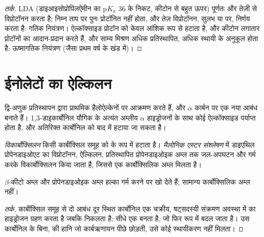 \begin{proof}[तर्क]
LDA (डाइआइसोप्रोपिलऐमीन का $\mathrm pK_a$ 36 के निकट, कीटोन से बहुत ऊपर) पूर्णतः और
तेज़ी से विप्रोटॉनन करता है; निम्न ताप पर  पुनः प्रोटॉनित नहीं होता, और तेज़ विप्रोटॉनन, सुलभ
 या  पर, निर्णय करता है: गतिक नियंत्रण। ऐल्कॉक्साइड प्रोटॉन को केवल आंशिक रूप से हटाता है,
 और कीटोन लगातार प्रोटॉनों का आदान-प्रदान करते हैं, और साम्य मिश्रण अधिक
प्रतिस्थापित, अधिक स्थायी  के अनुकूल होता है: ऊष्मागतिक नियंत्रण (जैसा प्रथम वर्ष के खंड में)।
\end{proof}

\section{ईनोलेटों का ऐल्किलन}

 द्वि-अणुक प्रतिस्थापन द्वारा प्राथमिक हैलोऐल्केनों पर आक्रमण करते हैं, और $\alpha$ कार्बन पर एक नया  आबंध
बनाते हैं। 1,3-डाइकार्बोनिल यौगिक के अत्यंत अम्लीय $\alpha$ हाइड्रोजनों के साथ कोई ऐल्कॉक्साइड
पर्याप्त होता है, और अतिरिक्त कार्बोनिल को बाद में हटाया जा सकता है।

\begin{definition}[विकार्बोक्सिलन]\label{def:b2:enolates-aldol:decarboxylation}
\emph{विकार्बोक्सिलन} किसी कार्बॉक्सिल समूह को  के रूप में हटाता है।
\emph{मैलोनिक एस्टर संश्लेषण} में डाइएथिल प्रोपेनडाइओएट का विप्रोटॉनन,
ऐल्किलन, प्रतिस्थापित प्रोपेनडाइओइक अम्ल तक जल-अपघटन और गर्म करके विकार्बोक्सिलन किया जाता है, जिससे
एक कार्बोक्सिलिक अम्ल  मिलता है।
\end{definition}

\begin{proposition}[सुगम विकार्बोक्सिलन]\label{prop:b2:enolates-aldol:decarboxylation}
$\beta$-कीटो अम्ल और प्रोपेनडाइओइक अम्ल हल्का गर्म करने पर  खो देते हैं; सामान्य कार्बोक्सिलिक अम्ल
नहीं।
\end{proposition}

\begin{proof}[तर्क]
कार्बॉक्सिल समूह से दो आबंध दूर स्थित कार्बोनिल एक चक्रीय,
षट्सदस्यी संक्रमण अवस्था में  का हाइड्रोजन ग्रहण करता है जबकि  निकलता है: सीधे एक  बनता है, जो फिर
 रूप में बदल जाता है। उस कार्बोनिल के बिना,  की हानि जो कार्बऋणायन पीछे छोड़ती, उसे
कोई स्थायीकरण नहीं मिलता।
\end{proof}


